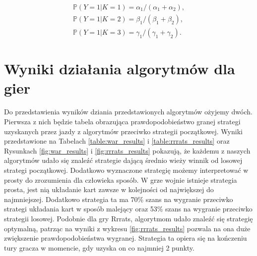 \documentclass[inzynierska]{pwr_wmat_praca_dyplomowa}
\theoremstyle{plain}
\numberwithin{theorem}{chapter}
\theoremstyle{definition}
\numberwithin{theorem}{chapter}
\newcommand{\probP}{\mathbb{P}}
\begin{document}
	\begin{gather*}
	 \probP(Y = 1|K=1) = \alpha_1/(\alpha_1+\alpha_2),\\
	 \probP(Y = 1|K=2) = \beta_1/(\beta_1+\beta_2),\\
	 \probP(Y = 1|K=3) = \gamma_1/(\gamma_1+\gamma_2). 
	\end{gather*}


	
	\chapter{Wyniki działania algorytmów dla gier}
	Do przedstawienia wyników dziania przedstawionych algorytmów ożyjemy dwóch. Pierwsza z nich będzie tabela obrazująca prawdopodobieństwo granej strategi uzyskanych przez jazdy z algorytmów przeciwko strategii początkowej.
	Wyniki przedstawione na Tabelach \ref{table:war_results} i \ref{table:rrrats_results} oraz Rysunkach \ref{fig:war_results} i \ref{fig:rrrats_results} pokazują, że każdemu z naszych algorytmów udało się znaleźć strategie dającą średnio wieży winnik od losowej strategi początkowej. Dodatkowo wyznaczone strategię możemy  interpretować w prosty do zrozumienia dla człowieka sposób.
	W grze wojnie istnieje strategia prosta, jest nią układanie kart zawsze w kolejności od największej do najmniejszej. Dodatkowo strategia ta ma 70\% szans na wygranie przeciwko strategi układania kart w sposób malejący oraz 53\% szans na wygranie przeciwko strategii losowej.
	Podobnie dla gry Rrrats, algorytmom udało znaleźć się strategię optymalną, patrząc na wyniki z wykresu \ref{fig:rrrats_results} pozwala na  ona duże zwiększenie prawdopodobieństwa wygranej. Strategia ta opiera się na kończeniu tury gracza w momencie, gdy uzyska on co najmniej 2 punkty.
\end{document}
